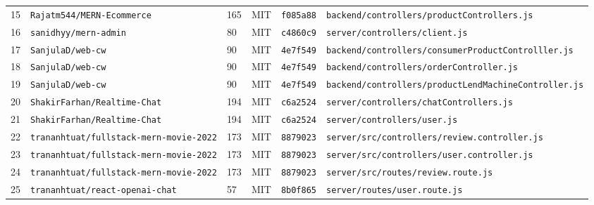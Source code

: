 \begin{table}[htbp]
\begin{tabular}{rllccl}
15 & \texttt{Rajatm544/MERN-Ecommerce} & 165 & MIT & \texttt{f085a88} & \texttt{backend/controllers/productControllers.js} \\
16 & \texttt{sanidhyy/mern-admin} & 80 & MIT & \texttt{c4860c9} & \texttt{server/controllers/client.js} \\
17 & \texttt{SanjulaD/web-cw} & 90 & MIT & \texttt{4e7f549} & \texttt{backend/controllers/consumerProductControlller.js} \\
18 & \texttt{SanjulaD/web-cw} & 90 & MIT & \texttt{4e7f549} & \texttt{backend/controllers/orderController.js} \\
19 & \texttt{SanjulaD/web-cw} & 90 & MIT & \texttt{4e7f549} & \texttt{backend/controllers/productLendMachineController.js} \\
20 & \texttt{ShakirFarhan/Realtime-Chat} & 194 & MIT & \texttt{c6a2524} & \texttt{server/controllers/chatControllers.js} \\
21 & \texttt{ShakirFarhan/Realtime-Chat} & 194 & MIT & \texttt{c6a2524} & \texttt{server/controllers/user.js} \\
22 & \texttt{trananhtuat/fullstack-mern-movie-2022} & 173 & MIT & \texttt{8879023} & \texttt{server/src/controllers/review.controller.js} \\
23 & \texttt{trananhtuat/fullstack-mern-movie-2022} & 173 & MIT & \texttt{8879023} & \texttt{server/src/controllers/user.controller.js} \\
24 & \texttt{trananhtuat/fullstack-mern-movie-2022} & 173 & MIT & \texttt{8879023} & \texttt{server/src/routes/review.route.js} \\
25 & \texttt{trananhtuat/react-openai-chat} & 57 & MIT & \texttt{8b0f865} & \texttt{server/routes/user.route.js} \\
\bottomrule
\end{tabular}
\end{table}
